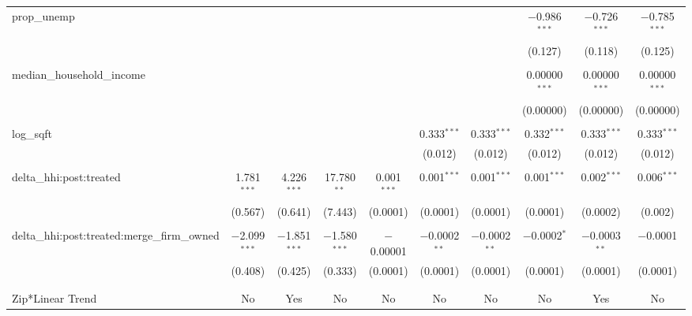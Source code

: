 \begin{table}[H]
{\begin{tabular}{@{\extracolsep{5pt}}lccccccccc}
  prop\_unemp &  &  &  &  &  &  & $-$0.986$^{***}$ & $-$0.726$^{***}$ & $-$0.785$^{***}$ \\  

   &  &  &  &  &  &  & (0.127) & (0.118) & (0.125) \\  

   & & & & & & & & & \\  

  median\_household\_income &  &  &  &  &  &  & 0.00000$^{***}$ & 0.00000$^{***}$ & 0.00000$^{***}$ \\  

   &  &  &  &  &  &  & (0.00000) & (0.00000) & (0.00000) \\  

   & & & & & & & & & \\  

  log\_sqft &  &  &  &  & 0.333$^{***}$ & 0.333$^{***}$ & 0.332$^{***}$ & 0.333$^{***}$ & 0.333$^{***}$ \\  

   &  &  &  &  & (0.012) & (0.012) & (0.012) & (0.012) & (0.012) \\  

   & & & & & & & & & \\  

  delta\_hhi:post:treated & 1.781$^{***}$ & 4.226$^{***}$ & 17.780$^{**}$ & 0.001$^{***}$ & 0.001$^{***}$ & 0.001$^{***}$ & 0.001$^{***}$ & 0.002$^{***}$ & 0.006$^{***}$ \\  

   & (0.567) & (0.641) & (7.443) & (0.0001) & (0.0001) & (0.0001) & (0.0001) & (0.0002) & (0.002) \\  

   & & & & & & & & & \\  

  delta\_hhi:post:treated:merge\_firm\_owned & $-$2.099$^{***}$ & $-$1.851$^{***}$ & $-$1.580$^{***}$ & $-$0.00001 & $-$0.0002$^{**}$ & $-$0.0002$^{**}$ & $-$0.0002$^{*}$ & $-$0.0003$^{**}$ & $-$0.0001 \\  

   & (0.408) & (0.425) & (0.333) & (0.0001) & (0.0001) & (0.0001) & (0.0001) & (0.0001) & (0.0001) \\  

   & & & & & & & & & \\  

 \hline \\[-1.8ex]  

 Zip*Linear Trend & No & Yes & No & No & No & No & No & Yes & No \\  


\end{tabular}}
\end{table}
